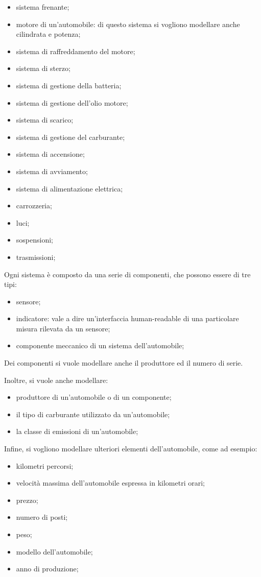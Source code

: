 \begin{itemize}
    \item sistema frenante;
    \item motore di un'automobile: di questo sistema si vogliono modellare anche cilindrata e potenza;
    \item sistema di raffreddamento del motore;
    \item sistema di sterzo;
    \item sistema di gestione della batteria;
    \item sistema di gestione dell'olio motore;
    \item sistema di scarico;
    \item sistema di gestione del carburante;
    \item sistema di accensione;
    \item sistema di avviamento;
    \item sistema di alimentazione elettrica;
    \item carrozzeria;
    \item luci;
    \item sospensioni;
    \item trasmissioni;
\end{itemize}

Ogni sistema è composto da una serie di componenti, che possono essere di tre tipi:
\begin{itemize}
    \item sensore;
    \item indicatore: vale a dire un'interfaccia human-readable di una particolare misura rilevata da un sensore;
    \item componente meccanico di un sistema dell'automobile;
\end{itemize}

Dei componenti si vuole modellare anche il produttore ed il numero di serie.

Inoltre, si vuole anche modellare:

\begin{itemize}
    \item produttore di un'automobile o di un componente;
    \item il tipo di carburante utilizzato da un'automobile;
    \item la classe di emissioni di un'automobile;
\end{itemize}

Infine, si vogliono modellare ulteriori elementi dell'automobile, come ad esempio:

\begin{itemize}
    \item kilometri percorsi;
    \item velocità massima dell'automobile espressa in kilometri orari;
    \item prezzo;
    \item numero di posti;
    \item peso;
    \item modello dell'automobile;
    \item anno di produzione;
\end{itemize}